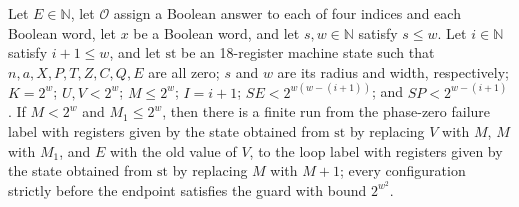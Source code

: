 \begin{theorem}
\label{Complexity.LogProg.SavitchARM.tail0F}
\leanok
{}
Let $E\in\mathbb N$, let $\mathcal O$ assign a Boolean answer to each of four indices
and each Boolean word, let $x$ be a Boolean word, and let $s,w\in\mathbb N$ satisfy
$s\le w$. Let $i\in\mathbb N$ satisfy $i+1\le w$, and let $\mathrm{st}$ be an
18-register machine state such that $n,a,X,P,T,Z,C,Q,E$ are all zero; $s$ and $w$ are
its radius and width, respectively; $K=2^w$; $U,V<2^w$; $M\le2^w$; $I=i+1$;
$SE<2^{w(w-(i+1))}$; and $SP<2^{w-(i+1)}$. If $M<2^w$ and $M_1\le2^w$, then there is a
finite run from the phase-zero failure label with registers given by the state obtained
from $\mathrm{st}$ by replacing $V$ with $M$, $M$ with $M_1$, and $E$ with the old value
of $V$, to the loop label with registers given by the state obtained from $\mathrm{st}$
by replacing $M$ with $M+1$; every configuration strictly before the endpoint satisfies
the guard with bound $2^{w^2}$.
\end{theorem}

